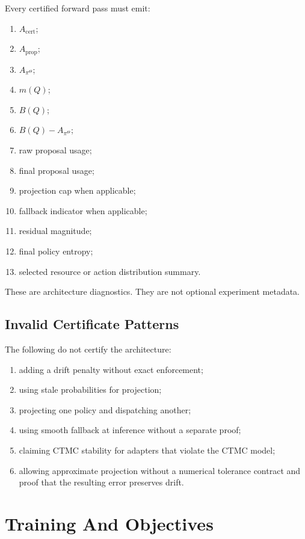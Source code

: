 \documentclass[a4paper,11pt]{article}
\theoremstyle{definition}
\begin{document}
Every certified forward pass must emit:
\begin{enumerate}
  \item \(A_{\mathrm{cert}}\);
  \item \(A_{\mathrm{prop}}\);
  \item \(A_{\pi^\Theta}\);
  \item \(m(Q)\);
  \item \(B(Q)\);
  \item \(B(Q)-A_{\pi^\Theta}\);
  \item raw proposal usage;
  \item final proposal usage;
  \item projection cap when applicable;
  \item fallback indicator when applicable;
  \item residual magnitude;
  \item final policy entropy;
  \item selected resource or action distribution summary.
\end{enumerate}
These are architecture diagnostics. They are not optional experiment metadata.

\subsection{Invalid Certificate Patterns}

The following do not certify the architecture:
\begin{enumerate}
  \item adding a drift penalty without exact enforcement;
  \item using stale probabilities for projection;
  \item projecting one policy and dispatching another;
  \item using smooth fallback at inference without a separate proof;
  \item claiming CTMC stability for adapters that violate the CTMC model;
  \item allowing approximate projection without a numerical tolerance contract
        and proof that the resulting error preserves drift.
\end{enumerate}

\section{Training And Objectives}
\end{document}
